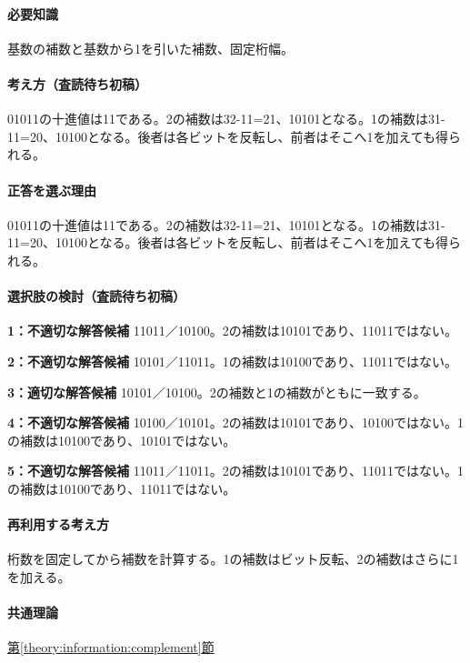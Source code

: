 \paragraph{必要知識} 基数の補数と基数から1を引いた補数、固定桁幅。

\paragraph{考え方（査読待ち初稿）} 01011の十進値は11である。2の補数は32-11=21、10101となる。1の補数は31-11=20、10100となる。後者は各ビットを反転し、前者はそこへ1を加えても得られる。

\paragraph{正答を選ぶ理由} 01011の十進値は11である。2の補数は32-11=21、10101となる。1の補数は31-11=20、10100となる。後者は各ビットを反転し、前者はそこへ1を加えても得られる。

\paragraph{選択肢の検討（査読待ち初稿）}

\noindent\textbf{1：不適切な解答候補} 11011／10100。2の補数は10101であり、11011ではない。\par

\noindent\textbf{2：不適切な解答候補} 10101／11011。1の補数は10100であり、11011ではない。\par

\noindent\textbf{3：適切な解答候補} 10101／10100。2の補数と1の補数がともに一致する。\par

\noindent\textbf{4：不適切な解答候補} 10100／10101。2の補数は10101であり、10100ではない。1の補数は10100であり、10101ではない。\par

\noindent\textbf{5：不適切な解答候補} 11011／11011。2の補数は10101であり、11011ではない。1の補数は10100であり、11011ではない。\par

\paragraph{再利用する考え方} 桁数を固定してから補数を計算する。1の補数はビット反転、2の補数はさらに1を加える。

\paragraph{共通理論} \hyperref[theory:information:complement]{第\ref*{theory:information:complement}節}

